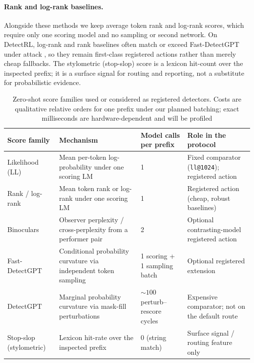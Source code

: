 \documentclass[pdflatex,sn-mathphys-num]{sn-jnl}
\begin{document}
\paragraph*{Rank and log-rank baselines.}
Alongside these methods we keep average token rank and log-rank scores, which require only one scoring model and no sampling or second network. On DetectRL, log-rank and rank baselines often match or exceed Fast-DetectGPT under attack \citep{wu2024}, so they remain first-class registered actions rather than merely cheap fallbacks. The stylometric (stop-slop) score is a lexicon hit-count over the inspected prefix; it is a surface signal for routing and reporting, not a substitute for probabilistic evidence.

\begin{table}[t]
\caption{Zero-shot score families used or considered as registered detectors. Costs are qualitative relative orders for one prefix under our planned batching; exact milliseconds are hardware-dependent and will be profiled}\label{tab:detectors}
\small
\begin{tabularx}{\textwidth}{@{}>{\raggedright\arraybackslash}p{}Yp{0.14\textwidth}p{0.16\textwidth}@{}}
\toprule
Score family & Mechanism & Model calls per prefix & Role in the protocol \\
\midrule
Likelihood (LL) & Mean per-token log-probability under one scoring LM & 1 & Fixed comparator (\texttt{ll@1024}); registered action \\
Rank / log-rank & Mean token rank or log-rank under one scoring LM & 1 & Registered action (cheap, robust baselines) \\
Binoculars & Observer perplexity / cross-perplexity from a performer pair & 2 & Optional contrasting-model registered action \\
Fast-DetectGPT & Conditional probability curvature via independent token sampling & 1 scoring + 1 sampling batch & Optional registered extension \\
DetectGPT & Marginal probability curvature via mask-fill perturbations & \(\sim100\) perturb--rescore cycles & Expensive comparator; not on the default route \\
Stop-slop (stylometric) & Lexicon hit-rate over the inspected prefix & 0 (string match) & Surface signal / routing feature only \\
\bottomrule
\end{tabularx}
\end{table}
\end{document}
